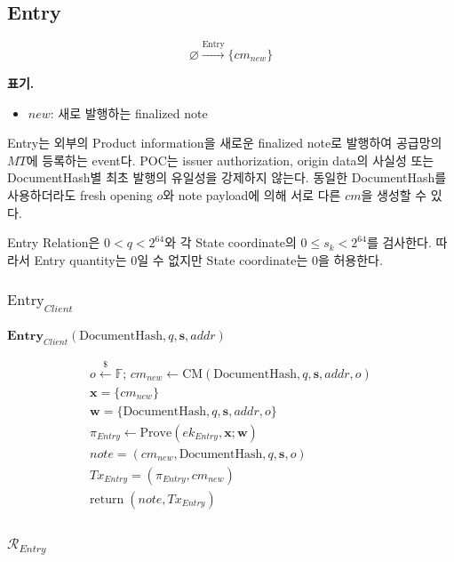 \documentclass[11pt,a4paper]{extarticle}
\newcommand{\CM}{\mathrm{CM}}
\newcommand{\Prove}{\mathrm{Prove}}
\newcommand{\sample}{\xleftarrow{\$}}
\newcommand{\DocumentHash}{\mathrm{DocumentHash}}
\newcommand{\Return}{\mathrm{return}\;}
\newenvironment{schemeblock}
{%
  \begingroup
  \setlength{\jot}{8pt}%
  \setlength{\parskip}{0pt}%
  \setlength{\abovedisplayskip}{9pt}%
  \setlength{\belowdisplayskip}{0pt}%
  \setlength{\abovedisplayshortskip}{9pt}%
  \setlength{\belowdisplayshortskip}{0pt}%
  \begin{mdframed}[
    linewidth=0.4pt,
    linecolor=black,
    innerleftmargin=8pt,
    innerrightmargin=8pt,
    innertopmargin=8pt,
    innerbottommargin=8pt,
    skipabove=0pt,
    skipbelow=5pt,
    splittopskip=8pt,
    splitbottomskip=8pt
  ]
  \centering
}
{%
  \end{mdframed}
  \endgroup
}
\begin{document}
\subsection{Entry}

\[
  \varnothing
  \xrightarrow{\mathrm{Entry}}
  \{cm_{new}\}
\]

\noindent\textbf{표기.}
\begin{itemize}[nosep]
  \item $new$: 새로 발행하는 finalized note
\end{itemize}

Entry는 외부의 Product information을 새로운 finalized note로 발행하여 공급망의
$MT$에 등록하는 event다. POC는 issuer authorization, origin data의 사실성 또는
DocumentHash별 최초 발행의 유일성을 강제하지 않는다. 동일한 DocumentHash를 사용하더라도
fresh opening $o$와 note payload에 의해 서로 다른 $cm$을 생성할 수 있다.

Entry Relation은 $0<q<2^{64}$와 각 State coordinate의
$0\leq s_k<2^{64}$를 검사한다. 따라서 Entry quantity는 0일 수 없지만 State
coordinate는 0을 허용한다.

\subsubsection{\texorpdfstring{$\mathrm{Entry}_{Client}$}{Entry\_Client}}

\begin{schemeblock}
\(
  \mathbf{Entry}_{Client}
  (\DocumentHash,q,\mathbf{s},addr)
\)

\begin{gather*}
  o\sample\mathbb{F}; \, cm_{new}
  \gets
  \CM(\DocumentHash,q,\mathbf{s},addr,o)
  \\
  \mathbf{x}=\{cm_{new}\}
  \\
  \mathbf{w}=\{\DocumentHash,q,\mathbf{s},addr,o\}
  \\
  \pi_{Entry}
  \gets
  \Prove(ek_{Entry},\mathbf{x};\mathbf{w})
  \\
  \mathit{note}=(cm_{new},\DocumentHash,q,\mathbf{s},o)
  \\
  \mathit{Tx}_{Entry}=(\pi_{Entry},cm_{new})
  \\
  \Return (\mathit{note},\mathit{Tx}_{Entry})
\end{gather*}
\end{schemeblock}

\subsubsection{\texorpdfstring{$\mathcal{R}_{Entry}$}{R\_Entry}}
\end{document}
